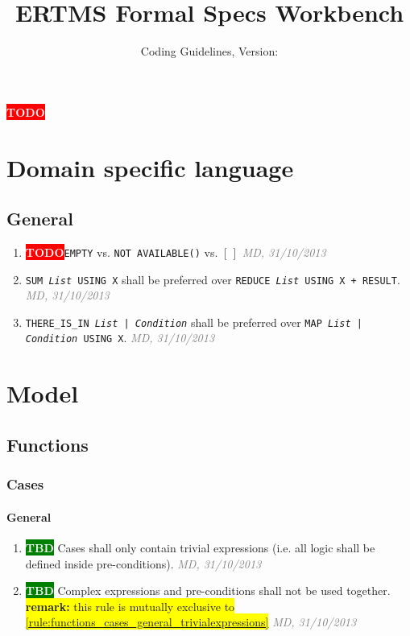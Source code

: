 \documentclass[a4paper, oneside]{scrreprt}
\newcommand{\docTitle}{ERTMS Formal Specs Workbench}
\newcommand{\docSubTitle}{Coding Guidelines}
\let\emph\textsl
\newcommand{\code}[1]{\texttt{#1}}
\newcommand{\TODO}{\colorbox{red}{\textcolor{white}{\textbf{\textsf{TODO}}}}\xspace}
\newcommand{\TBD}{\colorbox{green}{\textcolor{white}{\textbf{\textsf{TBD}}}}\xspace}
\newcommand{\remark}[1]{\mbox{}\newline\colorbox{yellow}{\textsf{\textbf{remark:} #1}}\xspace}
\newcommand{\ruleauthor}[2]{\mbox{}\newline\mbox{}\hfill{\footnotesize\textcolor{gray}{\emph{#1, #2}}}\xspace}
\begin{document}
\title{\docTitle}
\subtitle{\docSubTitle, Version: \vhCurrentVersion}
\date{\vhCurrentDate}
\author{\vhListAllAuthorsLongWithAbbrev}
\maketitle


\begin{versionhistory}
\end{versionhistory}

\newpage
\tableofcontents
\newpage

\TODO

\chapter{Domain specific language}

\section{General}
\begin{enumerate}
\item \TODO \code{EMPTY} vs. \code{NOT AVAILABLE()} vs. \code{$[\,]$} \ruleauthor{MD}{31/10/2013}
\item \code{SUM \emph{List} USING X} shall be preferred over \code{REDUCE \emph{List} USING X + RESULT}. \ruleauthor{MD}{31/10/2013}
\item \code{THERE\_IS\_IN \emph{List} | \emph{Condition}} shall be preferred over \code{MAP \emph{List} | \emph{Condition} USING X}. \ruleauthor{MD}{31/10/2013}
\end{enumerate}


\chapter{Model}

\section{Functions}
\subsection{Cases}

\subsubsection{General}
\begin{enumerate}
\item \label{rule:functions_cases_general_trivialexpressions}\TBD Cases shall only contain trivial expressions (i.e. all logic shall be defined inside pre-conditions). \ruleauthor{MD}{31/10/2013}
\item \TBD Complex expressions and pre-conditions shall not be used together. \remark{this rule is mutually exclusive to \ref{rule:functions_cases_general_trivialexpressions}} \ruleauthor{MD}{31/10/2013}
\end{enumerate}
\end{document}
